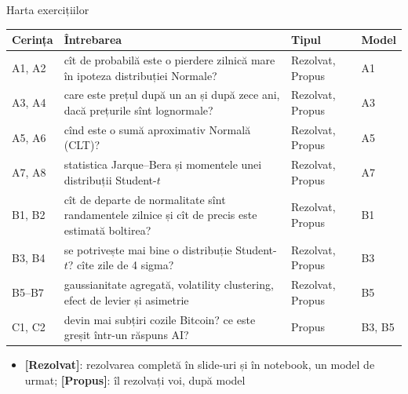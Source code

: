 \begin{frame}{Harta exercițiilor}
\itemsize{\small}
\begin{center}
\footnotesize
\begin{tabular}{>{\raggedright\arraybackslash}p{1.0cm}>{\raggedright\arraybackslash}p{7.6cm}>{\raggedright\arraybackslash}p{1.9cm}>{\raggedright\arraybackslash}p{1.4cm}}
\toprule
\textbf{Cerința} & \textbf{Întrebarea} & \textbf{Tipul} & \textbf{Model} \\
\midrule
A1, A2 & cît de probabilă este o pierdere zilnică mare în ipoteza distribuției Normale? & Rezolvat, Propus & A1 \\
A3, A4 & care este prețul după un an și după zece ani, dacă prețurile sînt lognormale? & Rezolvat, Propus & A3 \\
A5, A6 & cînd este o sumă aproximativ Normală (CLT)? & Rezolvat, Propus & A5 \\
A7, A8 & statistica Jarque--Bera și momentele unei distribuții Student-$t$ & Rezolvat, Propus & A7 \\
B1, B2 & cît de departe de normalitate sînt randamentele zilnice și cît de precis este estimată boltirea? & Rezolvat, Propus & B1 \\
B3, B4 & se potrivește mai bine o distribuție Student-$t$? cîte zile de 4 sigma? & Rezolvat, Propus & B3 \\
B5--B7 & gaussianitate agregată, volatility clustering, efect de levier și asimetrie & Rezolvat, Propus & B5 \\
C1, C2 & devin mai subțiri cozile Bitcoin? ce este greșit într-un răspuns AI? & Propus & B3, B5 \\
\bottomrule
\end{tabular}
\end{center}
\begin{itemize}
    \item \textbf{[Rezolvat]}: rezolvarea completă în slide-uri și în notebook, un model de urmat; \textbf{[Propus]}: îl rezolvați voi, după model
\end{itemize}
\end{frame}


